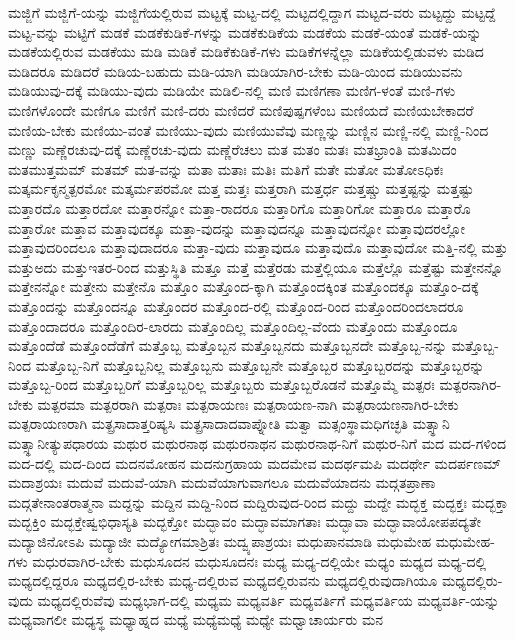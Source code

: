 {ಮಜ್ಜಿಗೆ
ಮಜ್ಜಿಗೆ-ಯನ್ನು
ಮಜ್ಜಿಗೆಯಲ್ಲಿರುವ
ಮಟ್ಟಕ್ಕೆ
ಮಟ್ಟ-ದಲ್ಲಿ
ಮಟ್ಟದಲ್ಲಿದ್ದಾಗ
ಮಟ್ಟದ-ವರು
ಮಟ್ಟದ್ದು
ಮಟ್ಟದ್ದೆ
ಮಟ್ಟ-ವನ್ನು
ಮಟ್ಟಿಗೆ
ಮಡಕೆ
ಮಡಕೆಕುಡಿಕೆ-ಗಳನ್ನು
ಮಡಕೆಕುಡಿಕೆಯ
ಮಡಕೆಯ
ಮಡಕೆ-ಯಂತೆ
ಮಡಕೆ-ಯನ್ನು
ಮಡಕೆಯಲ್ಲಿರುವ
ಮಡಕೆಯು
ಮಡಿ
ಮಡಿಕೆ
ಮಡಿಕೆಕುಡಿಕೆ-ಗಳು
ಮಡಿಕೆಗಳನ್ನೆಲ್ಲಾ
ಮಡಿಕೆಯಲ್ಲಿಡುವಳು
ಮಡಿದ
ಮಡಿದರೂ
ಮಡಿದರೆ
ಮಡಿಯ-ಬಹುದು
ಮಡಿ-ಯಾಗಿ
ಮಡಿಯಾಗಿರ-ಬೇಕು
ಮಡಿ-ಯಿಂದ
ಮಡಿಯುವನು
ಮಡಿಯುವು-ದಕ್ಕೆ
ಮಡಿಯು-ವುದು
ಮಡಿಯೇ
ಮಡಿಲಿ-ನಲ್ಲಿ
ಮಣಿ
ಮಣಿಗಣಾ
ಮಣಿಗ-ಳಂತೆ
ಮಣಿ-ಗಳು
ಮಣಿಗಳೊಂದೇ
ಮಣಿಗೂ
ಮಣಿಗೆ
ಮಣಿ-ದರು
ಮಣಿದರೆ
ಮಣಿಪುಷ್ಪಗಳೆಂಬ
ಮಣಿಯದೆ
ಮಣಿಯಬೇಕಾದರೆ
ಮಣಿಯ-ಬೇಕು
ಮಣಿಯು-ವಂತೆ
ಮಣಿಯು-ವುದು
ಮಣಿಯುವೆವು
ಮಣ್ಣನ್ನು
ಮಣ್ಣಿನ
ಮಣ್ಣಿ-ನಲ್ಲಿ
ಮಣ್ಣಿ-ನಿಂದ
ಮಣ್ಣು
ಮಣ್ಣೆರಚುವು-ದಕ್ಕೆ
ಮಣ್ಣೆರಚು-ವುದು
ಮಣ್ಣೆರೆಚಲು
ಮತ
ಮತಂ
ಮತಃ
ಮತಭ್ರಾಂತಿ
ಮತಮಿದಂ
ಮತಮುತ್ತಮಮ್
ಮತಮ್
ಮತ-ವನ್ನು
ಮತಾ
ಮತಾಃ
ಮತಿಃ
ಮತಿಗೆ
ಮತೇ
ಮತೋ
ಮತೋಽಧಿಕಃ
ಮತ್ಕರ್ಮಕೃನ್ಮತ್ಪರಮೋ
ಮತ್ಕರ್ಮಪರಮೋ
ಮತ್ತ
ಮತ್ತಃ
ಮತ್ತರಾಗಿ
ಮತ್ತರ್ಧ
ಮತ್ತಷ್ಚು
ಮತ್ತಷ್ಟನ್ನು
ಮತ್ತಷ್ಟು
ಮತ್ತಾರದೊ
ಮತ್ತಾರದೋ
ಮತ್ತಾರನ್ನೋ
ಮತ್ತಾ-ರಾದರೂ
ಮತ್ತಾರಿಗೊ
ಮತ್ತಾರಿಗೋ
ಮತ್ತಾರೂ
ಮತ್ತಾರೊ
ಮತ್ತಾರೋ
ಮತ್ತಾವ
ಮತ್ತಾವುದಕ್ಕೂ
ಮತ್ತಾ-ವುದನ್ನು
ಮತ್ತಾವುದನ್ನೂ
ಮತ್ತಾವುದನ್ನೋ
ಮತ್ತಾವುದರಲ್ಲೋ
ಮತ್ತಾವುದರಿಂದಲೂ
ಮತ್ತಾವುದಾದರೂ
ಮತ್ತಾ-ವುದು
ಮತ್ತಾವುದೂ
ಮತ್ತಾವುದೊ
ಮತ್ತಾವುದೋ
ಮತ್ತಿ-ನಲ್ಲಿ
ಮತ್ತು
ಮತ್ತುಅದು
ಮತ್ತುಇತರ-ರಿಂದ
ಮತ್ತುಸ್ಥಿತಿ
ಮತ್ತೂ
ಮತ್ತೆ
ಮತ್ತೆರಡು
ಮತ್ತೆಲ್ಲಿಯೂ
ಮತ್ತೆಲ್ಲೊ
ಮತ್ತೆಷ್ಟು
ಮತ್ತೇನನ್ನೊ
ಮತ್ತೇನನ್ನೋ
ಮತ್ತೇನು
ಮತ್ತೇನೊ
ಮತ್ತೊಂ
ಮತ್ತೊಂದ-ಕ್ಕಾಗಿ
ಮತ್ತೊಂದಕ್ಕಿಂತ
ಮತ್ತೊಂದಕ್ಕೂ
ಮತ್ತೊಂ-ದಕ್ಕೆ
ಮತ್ತೊಂದನ್ನು
ಮತ್ತೊಂದನ್ನೂ
ಮತ್ತೊಂದರ
ಮತ್ತೊಂದ-ರಲ್ಲಿ
ಮತ್ತೊಂದ-ರಿಂದ
ಮತ್ತೊಂದರಿಂದಲಾದರೂ
ಮತ್ತೊಂದಾದರೂ
ಮತ್ತೊಂದಿರ-ಲಾರದು
ಮತ್ತೊಂದಿಲ್ಲ
ಮತ್ತೊಂದಿಲ್ಲ-ವೆಂದು
ಮತ್ತೊಂದು
ಮತ್ತೊಂದೂ
ಮತ್ತೊಂದೆಡೆ
ಮತ್ತೊಂದೆಡೆಗೆ
ಮತ್ತೊಬ್ಬ
ಮತ್ತೊಬ್ಬನ
ಮತ್ತೊಬ್ಬನದು
ಮತ್ತೊಬ್ಬನದೇ
ಮತ್ತೊಬ್ಬ-ನನ್ನು
ಮತ್ತೊಬ್ಬ-ನಿಂದ
ಮತ್ತೊಬ್ಬ-ನಿಗೆ
ಮತ್ತೊಬ್ಬನಿಲ್ಲ
ಮತ್ತೊಬ್ಬನು
ಮತ್ತೊಬ್ಬನೇ
ಮತ್ತೊಬ್ಬರ
ಮತ್ತೊಬ್ಬರದನ್ನು
ಮತ್ತೊಬ್ಬರನ್ನು
ಮತ್ತೊಬ್ಬ-ರಿಂದ
ಮತ್ತೊಬ್ಬರಿಗೆ
ಮತ್ತೊಬ್ಬರಿಲ್ಲ
ಮತ್ತೊಬ್ಬರು
ಮತ್ತೊಬ್ಬರೊಡನೆ
ಮತ್ತೊಮ್ಮೆ
ಮತ್ಪರಃ
ಮತ್ಪರನಾಗಿರ-ಬೇಕು
ಮತ್ಪರಮಾ
ಮತ್ಪರರಾಗಿ
ಮತ್ಪರಾಃ
ಮತ್ಪರಾಯಣಃ
ಮತ್ಪರಾಯಣ-ನಾಗಿ
ಮತ್ಪರಾಯಣನಾಗಿರ-ಬೇಕು
ಮತ್ಪರಾಯಣರಾಗಿ
ಮತ್ಪ್ರಸಾದಾತ್ತರಿಷ್ಯಸಿ
ಮತ್ಪ್ರಸಾದಾದವಾಪ್ನೋತಿ
ಮತ್ವಾ
ಮತ್ಸಂಸ್ಥಾಮಧಿಗಚ್ಛತಿ
ಮತ್ಸ್ಥಾನಿ
ಮತ್ಸ್ಥಾನೀತ್ಯುಪಧಾರಯ
ಮಥುರ
ಮಥುರನಾಥ
ಮಥುರನಾಥನ
ಮಥುರನಾಥ-ನಿಗೆ
ಮಥುರ-ನಿಗೆ
ಮದ
ಮದ-ಗಳಿಂದ
ಮದ-ದಲ್ಲಿ
ಮದ-ದಿಂದ
ಮದನಮೋಹನ
ಮದನುಗ್ರಹಾಯ
ಮದಮೇವ
ಮದರ್ಥಮಪಿ
ಮದರ್ಥೇ
ಮದರ್ಪಣಮ್
ಮದಾಶ್ರಯಃ
ಮದುವೆ
ಮದುವೆ-ಯಾಗಿ
ಮದುವೆಯಾಗುವಾಗಲೂ
ಮದುವೆಯಾದನು
ಮದ್ಗತಪ್ರಾಣಾ
ಮದ್ಗತೇನಾಂತರಾತ್ಮನಾ
ಮದ್ದನ್ನು
ಮದ್ದಿನ
ಮದ್ದಿ-ನಿಂದ
ಮದ್ದಿರುವುದ-ರಿಂದ
ಮದ್ದು
ಮದ್ದೇ
ಮದ್ಭಕ್ತ
ಮದ್ಭಕ್ತಃ
ಮದ್ಭಕ್ತಾ
ಮದ್ಭಕ್ತಿಂ
ಮದ್ಭಕ್ತೇಷ್ವಭಿಧಾಸ್ಯತಿ
ಮದ್ಭಕ್ತೋ
ಮದ್ಭಾವಂ
ಮದ್ಭಾವಮಾಗತಾಃ
ಮದ್ಭಾವಾ
ಮದ್ಭಾವಾಯೋಪಪದ್ಯತೇ
ಮದ್ಯಾಜಿನೋಽಪಿ
ಮದ್ಯಾಜೀ
ಮದ್ಯೋಗಮಾಶ್ರಿತಃ
ಮದ್ವ್ಯಪಾಶ್ರಯಃ
ಮಧುಪಾನಮಾಡಿ
ಮಧುಮೇಹ
ಮಧುಮೇಹ-ಗಳು
ಮಧುರವಾಗಿರ-ಬೇಕು
ಮಧುಸೂದನ
ಮಧುಸೂದನಃ
ಮಧ್ಯ
ಮಧ್ಯ-ದಲ್ಲಿಯೇ
ಮಧ್ಯಂ
ಮಧ್ಯದ
ಮಧ್ಯ-ದಲ್ಲಿ
ಮಧ್ಯದಲ್ಲಿದ್ದರೂ
ಮಧ್ಯದಲ್ಲಿರ-ಬೇಕು
ಮಧ್ಯ-ದಲ್ಲಿರುವ
ಮಧ್ಯದಲ್ಲಿರುವನು
ಮಧ್ಯದಲ್ಲಿರುವುದಾಗಿಯೂ
ಮಧ್ಯದಲ್ಲಿರು-ವುದು
ಮಧ್ಯದಲ್ಲಿರುವೆವು
ಮಧ್ಯಭಾಗ-ದಲ್ಲಿ
ಮಧ್ಯಮ
ಮಧ್ಯವರ್ತಿ
ಮಧ್ಯವರ್ತಿಗೆ
ಮಧ್ಯವರ್ತಿಯ
ಮಧ್ಯವರ್ತಿ-ಯನ್ನು
ಮಧ್ಯವಾಗಲೀ
ಮಧ್ಯಸ್ಥ
ಮಧ್ಯಾಹ್ನದ
ಮಧ್ಯೆ
ಮಧ್ಯೆಮಧ್ಯೆ
ಮಧ್ಯೇ
ಮಧ್ವಾಚಾರ್ಯರು
ಮನ
}
